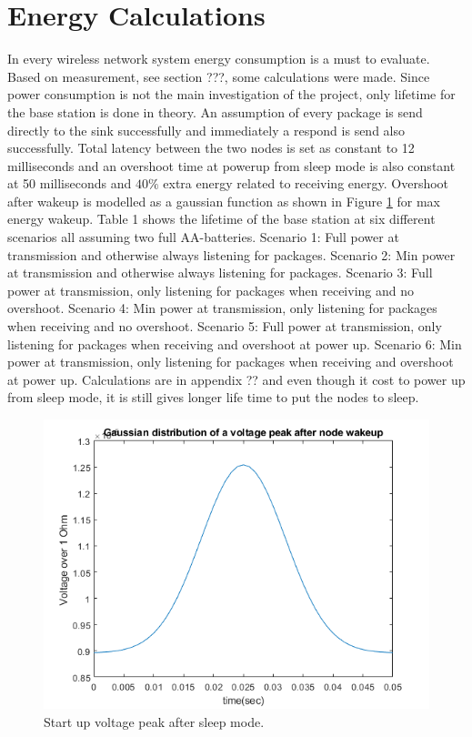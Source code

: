 \section{Energy Calculations}\label{sc:energyCalculations}
In every wireless network system energy consumption is a must to evaluate. Based on measurement, see section ???, some calculations were made. Since power consumption is not the main investigation of the project, only lifetime for the base station is done in theory. An assumption of every package is send directly to the sink successfully and immediately a respond is send also successfully. Total latency between the two nodes is set as constant to 12 milliseconds and an overshoot time at powerup from sleep mode is also constant at 50 milliseconds and $40\%$ extra energy related to receiving energy. Overshoot after wakeup is modelled as a gaussian function as shown in Figure \ref{fig:gaussianDistributionsOfVoltagePeak} for max energy wakeup. Table 1 shows the lifetime of the base station at six different scenarios all assuming two full AA-batteries.%
Scenario 1: Full power at transmission and otherwise always listening for packages.
Scenario 2: Min power at transmission and otherwise always listening for packages.
Scenario 3: Full power at transmission, only listening for packages when receiving and no overshoot.
Scenario 4: Min power at transmission, only listening for packages when receiving and no overshoot.
Scenario 5: Full power at transmission, only listening for packages when receiving and overshoot at power up.
Scenario 6: Min power at transmission, only listening for packages when receiving and overshoot at power up.
Calculations are in appendix ?? and even though it cost to power up from sleep mode, it is still gives longer life time to put the nodes to sleep.

\begin{figure}[H]
	\centering
	\includegraphics[width=\linewidth]{theory/energyCalculations/fig/gaussianDistributionsOfVoltagePeak.png}
	\caption{Start up voltage peak after sleep mode.}
	\label{fig:gaussianDistributionsOfVoltagePeak}
\end{figure}
